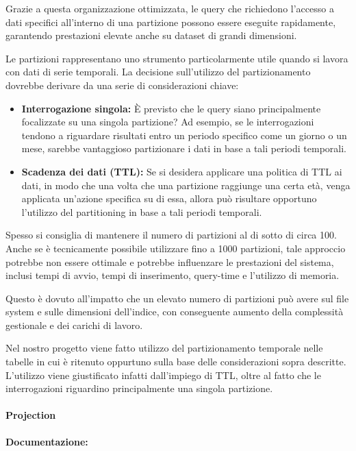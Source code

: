 Grazie a questa organizzazione ottimizzata, le query che richiedono l'accesso a dati specifici all'interno di una partizione possono essere eseguite rapidamente, garantendo prestazioni elevate anche su dataset di grandi dimensioni.

Le partizioni rappresentano uno strumento particolarmente utile quando si lavora con dati di serie temporali. La decisione sull'utilizzo del partizionamento dovrebbe derivare da una serie di considerazioni chiave:

\begin{itemize}
	\item \textbf{Interrogazione singola:} È previsto che le query siano principalmente focalizzate su una singola partizione? Ad esempio, se le interrogazioni tendono a riguardare risultati entro un periodo specifico come un giorno o un mese, sarebbe vantaggioso partizionare i dati in base a tali periodi temporali.
	\item \textbf{Scadenza dei dati (TTL):} Se si desidera applicare una politica di TTL ai dati, in modo che una volta che una partizione raggiunge una certa età, venga applicata un'azione specifica su di essa, allora può risultare opportuno l'utilizzo del partitioning in base a tali periodi temporali.
\end{itemize}

Spesso si consiglia di mantenere il numero di partizioni al di sotto di circa 100. Anche se è tecnicamente possibile utilizzare fino a 1000 partizioni, tale approccio potrebbe non essere ottimale e potrebbe influenzare le prestazioni del sistema, inclusi tempi di avvio, tempi di inserimento, query-time e l'utilizzo di memoria.

Questo è dovuto all'impatto che un elevato numero di partizioni può avere sul file system e sulle dimensioni dell'indice, con conseguente aumento della complessità gestionale e dei carichi di lavoro.

Nel nostro progetto viene fatto utilizzo del partizionamento temporale nelle tabelle in cui è ritenuto oppurtuno sulla base delle considerazioni sopra descritte. L'utilizzo viene giustificato infatti dall'impiego di TTL, oltre al fatto che le interrogazioni riguardino principalmente una singola partizione.
    
\paragraph{Projection}\label{sec:projections}
\textbf{Documentazione:}


